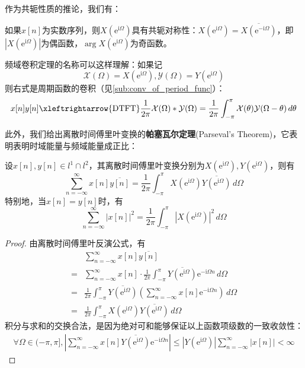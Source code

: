\documentclass{ctexbook}
\begin{document}
作为共轭性质的推论，我们有：
\begin{corollary}
    如果$x[n]$为实数序列，则$X(\mathrm{e}^{\mathrm{i}\Omega})$具有共轭对称性：$X(\mathrm{e}^{\mathrm{i}\Omega})=\overline{X\left(\mathrm{e}^{-\mathrm{i}\Omega}\right)}$，即$|X(\mathrm{e}^{\mathrm{i}\Omega})|$为偶函数，$\arg X(\mathrm{e}^{\mathrm{i}\Omega})$为奇函数。
\end{corollary}

频域卷积定理的名称可以这样理解：如果记
$$\mathcal{X} (\Omega)=X(\mathrm{e}^{\mathrm{i}\Omega}),\mathcal{Y} (\Omega)=Y(\mathrm{e}^{\mathrm{i}\Omega})$$
则右式是周期函数的卷积（见\ref{sub:conv_of_period_func}）：
\[x[n]y[n]\xleftrightarrow{\text{DTFT}}\frac{1}{2\pi}\mathcal{X} (\Omega)*\mathcal{Y} (\Omega)=\frac{1}{2\pi}\int_{-\pi}^{\pi}\mathcal{X} (\theta)\mathcal{Y} (\Omega-\theta)\,d\theta\]

此外，我们给出离散时间傅里叶变换的\textbf{帕塞瓦尔定理}(Parseval's Theorem)，它表明表明时域能量与频域能量成正比：
\begin{theorem}[离散时间傅里叶变换的帕塞瓦尔定理]
    设$x[n],y[n]\in l^1\cap l^2$，其离散时间傅里叶变换分别为$X(\mathrm{e}^{\mathrm{i}\Omega}),Y(\mathrm{e}^{\mathrm{i}\Omega})$，则有
    \[\sum_{n=-\infty}^{\infty}x[n]\overline{y[n]}=\frac{1}{2\pi}\int_{-\pi}^{\pi}X(\mathrm{e}^{\mathrm{i}\Omega})\overline{Y(\mathrm{e}^{\mathrm{i}\Omega})}\,d\Omega\]
    特别地，当$x[n]=y[n]$时，有
    \[\sum_{n=-\infty}^{\infty}|x[n]|^2=\frac{1}{2\pi}\int_{-\pi}^{\pi}|X(\mathrm{e}^{\mathrm{i}\Omega})|^2\,d\Omega\]
\end{theorem}
\begin{proof}
    由离散时间傅里叶反演公式，有
    \begin{align*}
        &\sum_{n=-\infty}^{\infty}x[n]\overline{y[n]}\\
        =&\sum_{n=-\infty}^{\infty}x[n]\cdot\frac{1}{2\pi}\int_{-\pi}^{\pi}\overline{Y(\mathrm{e}^{\mathrm{i}\Omega})}\mathrm{e}^{-\mathrm{i}\Omega n}\,d\Omega\\
        =&\frac{1}{2\pi}\int_{-\pi}^{\pi}\overline{Y(\mathrm{e}^{\mathrm{i}\Omega})}\left(\sum_{n=-\infty}^{\infty}x[n]\mathrm{e}^{-\mathrm{i}\Omega n}\right)\,d\Omega\\
        =&\frac{1}{2\pi}\int_{-\pi}^{\pi}X(\mathrm{e}^{\mathrm{i}\Omega})\overline{Y(\mathrm{e}^{\mathrm{i}\Omega})}\,d\Omega
    \end{align*}
    积分与求和的交换合法，是因为绝对可和能够保证以上函数项级数的一致收敛性：\begin{align*}
    \forall\Omega\in(-\pi,\pi],\left|\sum_{n=-\infty}^{\infty}x[n]\overline{Y(\mathrm{e}^{\mathrm{i}\Omega})}\mathrm{e}^{-\mathrm{i}\Omega n}\right|\leq\left|Y(\mathrm{e}^{\mathrm{i}\Omega})\right|\sum_{n=-\infty}^{\infty}|x[n]|<\infty
    \end{align*}
\end{proof}
\end{document}
